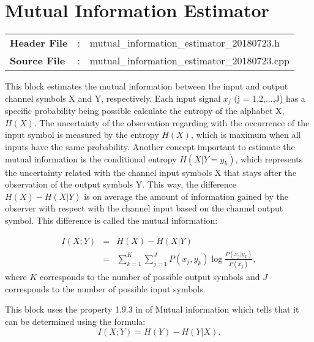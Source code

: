 \clearpage

\section{Mutual Information Estimator}
\label{sec_mi}
\begin{refsection}

\begin{tcolorbox}	
	\begin{tabular}{p{2.75cm} p{0.2cm} p{10.5cm}} 	
		\textbf{Header File}   &:& mutual\_information\_estimator\_20180723.h \\
		\textbf{Source File}   &:& mutual\_information\_estimator\_20180723.cpp \\
	\end{tabular}
\end{tcolorbox}

This block estimates the mutual information between the input and output channel symbols X and Y, respectively. Each input signal $x_j$ (j = 1,2,...,J) has a specific probability being possible calculate the entropy of the alphabet X, $H(X)$. The uncertainty of the observation regarding with the occurrence of the input symbol is measured by the entropy $H(X)$, which is maximum when all inputs have the same probability. Another concept important to estimate the mutual information is the conditional entropy $H(X|Y=y_k)$, which represents the uncertainty related with the channel input symbols X that stays after the observation of the output symbols Y. This way, the difference $H(X) - H(X|Y)$ is on average the amount of information gained by the observer with respect with the channel input based on the channel output symbol. This difference is called the mutual information:

\begin{eqnarray}
 \nonumber %
  I(X;Y)    &=& H(X) - H(X|Y) \\
            &=& \sum_{k=1}^{K}\sum_{j=1}^{J}P(x_j,y_k)\log \frac{P(x_j|y_k)}{P(x_j)},
\end{eqnarray}
where $K$ corresponds to the number of possible output symbols and $J$ corresponds to the number of possible input symbols.

This block uses the property 1.9.3 in \cite{Wesolowski09} of Mutual information which tells that it can be determined using the formula:
\begin{equation}\label{eq:mi_property}
  I(X;Y) = H(Y)- H(Y|X).
\end{equation}


\end{refsection}
